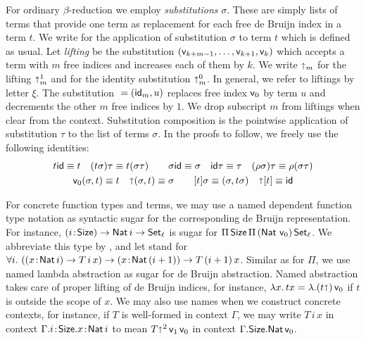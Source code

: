 \documentclass[acmlarge,review,anonymous]{acmart}\settopmatter{printfolios=true}
\begin{document}
For ordinary $\beta$-reduction we employ
\emph{substitutions} $\sigma$.  These are simply lists of terms that provide one term as replacement for each free de Bruijn index in a term $t$. We write  for the application of substitution $\sigma$ to term $t$ which is defined as usual.  Let \emph{lifting}  be the substitution $(\ind{k+m-1},\dots,\ind{k+1},\ind k)$ which accepts a term with $m$ free indices and increases each of them by $k$.  We write $\slift_m$ for the lifting $\slift^1_m$ and  for the identity substitution $ \slift^0_m$. In general, we refer to liftings by letter $\xi$.
The substitution ${} = (\sid_m, u)$ replaces free index $\ind 0$ by term $u$ and decrements the other $m$ free indices by $1$. We drop subscript $m$ from liftings when clear from the context.
Substitution composition \fbox{$\sigma\tau$} is the pointwise application of substitution $\tau$ to the list of terms $\sigma$.  In the proofs to follow, we freely use the following identities:
\begin{gather*}
  t\sid \equiv t
\quad
  (t\sigma)\tau \equiv t(\sigma\tau)
\qquad
  \sigma \sid \equiv \sigma
\quad
  \sid \tau \equiv \tau
\quad
  (\rho\sigma)\tau \equiv \rho(\sigma\tau)
\\
  \ind 0 (\sigma,t) \equiv t
\quad
  \slift(\sigma,t) \equiv \sigma
\qquad
  [t]\sigma \equiv (\sigma, t\sigma)
\quad
  \slift[t] \equiv \sid
\end{gather*}

For concrete function types and terms, we may use a named dependent function type notation as syntactic sugar for the corresponding de Bruijn representation.  For instance, $\funT i \Size \Nat i \to \Set[\ell]$ is sugar for $\piT \Size \piT {(\Nat\,\ind 0)} \Set[\ell]$.  We abbreviate this type by \fbox{$\FixK\,\ell$}, and let  stand for
$\forall i.\ (\funT x {\Nat i} T\, i\, x) \to \funT x {\Nat (i + 1)} T \,(i+1)\, x$.
Similar as for $\Pi$, we use named lambda abstraction as sugar for de Bruijn abstraction.  Named abstraction takes care of proper lifting of de Bruijn indices, for instance, $\lambda x.\, t x = \lambda. (t \slift)\,\ind 0$ if $t$ is outside the scope of $x$.
We may also use names when we construct concrete contexts, for instance, if\/ $T$ is well-formed in context $\Gamma$, we may write $T\,i\,x$ in context $\Gamma.i\of\Size.x\of\Nat i$ to mean $T\slift^2\,\ind 1\,\ind 0$ in context
$\Gamma.\Size.\Nat \ind 0$.
\end{document}
